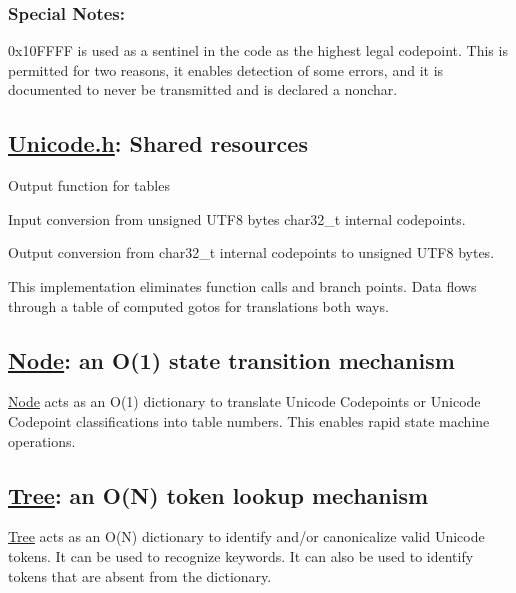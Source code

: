 \subsubsection*{Special Notes\+:}

0x10\+F\+F\+F\+F is used as a sentinel in the code as the highest legal codepoint. This is permitted for two reasons, it enables detection of some errors, and it is documented to never be transmitted and is declared a nonchar.

\subsection*{\hyperlink{_unicode_8h_source}{Unicode.\+h}\+: Shared resources}


\begin{DoxyItemize}
\item Output function for tables
\item Input conversion from unsigned U\+T\+F8 bytes char32\+\_\+t internal codepoints.
\item Output conversion from char32\+\_\+t internal codepoints to unsigned U\+T\+F8 bytes.
\end{DoxyItemize}

This implementation eliminates function calls and branch points. Data flows through a table of computed gotos for translations both ways.

\subsection*{\hyperlink{class_node}{Node}\+: an O(1) state transition mechanism}

\hyperlink{class_node}{Node} acts as an O(1) dictionary to translate Unicode Codepoints or Unicode Codepoint classifications into table numbers. This enables rapid state machine operations.

\subsection*{\hyperlink{class_tree}{Tree}\+: an O(\+N) token lookup mechanism}

\hyperlink{class_tree}{Tree} acts as an O(\+N) dictionary to identify and/or canonicalize valid Unicode tokens. It can be used to recognize keywords. It can also be used to identify tokens that are absent from the dictionary. 